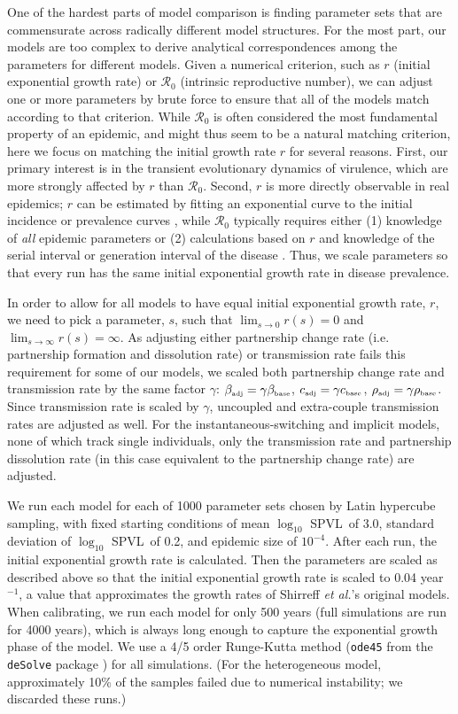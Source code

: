 \documentclass[10pt,letterpaper]{article}
\newcommand{\Lspvl}{$\log_{10}$ SPVL}
\newcommand{\rzero}{{\mathcal R}_0}
\newcommand{\etal}{\textit{et al.}}
\newcommand{\tsub}[2]{#1_{{\textrm{\tiny #2}}}}
\newcommand{\peryear}{year$^{-1}$}
\begin{document}
One of the hardest parts of model comparison is finding
parameter sets that are commensurate across radically different model
structures. For the most part, our models are too complex to
derive analytical correspondences among the parameters
for different models. Given a numerical
criterion, such as $r$ (initial exponential growth rate) or $\rzero$ 
(intrinsic reproductive number), we can adjust one or more
parameters by brute force to ensure that all of the models match
according to that criterion. While $\rzero$ is often considered
the most fundamental property of an epidemic, and might thus seem to
be a natural matching criterion, here we focus on matching the initial
growth rate $r$ for several reasons. First, our primary interest is in
the transient evolutionary dynamics of virulence, which are more
strongly affected by $r$ than $\rzero$. Second, $r$ is 
more directly observable in real epidemics; $r$ can be estimated by
fitting an exponential curve to the initial incidence or
prevalence curves \cite{ma_estimating_2014}, while $\rzero$
typically requires either (1) knowledge of \emph{all} epidemic
parameters or (2) calculations based on
$r$ and knowledge of the serial interval or generation interval of the
disease \cite{wallinga_how_2007}. Thus, we scale parameters so that
every run has the same initial exponential growth rate in 
disease prevalence.

In order to allow for all models to have equal initial exponential
growth rate, $r$, we need to pick a parameter, $s$, such that
$\lim_{s\to 0} r(s) = 0$ and $\lim_{s\to\infty} r(s) = \infty$. As
adjusting either partnership change rate (i.e. partnership formation
and dissolution rate) or transmission rate fails this requirement for
some of our models, we scaled both partnership change rate and
transmission rate by the same factor $\gamma$: $\tsub{\beta}{adj} =
\gamma \tsub{\beta}{base}$, $\tsub{c}{adj} = \gamma \tsub{c}{base}$,
$\tsub{\rho}{adj} = \gamma \tsub{\rho}{base}$. Since transmission rate
is scaled by $\gamma$, uncoupled and extra-couple
transmission rates are adjusted as well. For the instantaneous-switching
and implicit models, none of which track single individuals, 
only the transmission rate and partnership
dissolution rate (in this case equivalent to the partnership change
rate) are adjusted.

We run each model for each of 1000 parameter sets chosen by Latin hypercube sampling, with fixed starting conditions
of mean \Lspvl\ of 3.0, standard deviation of \Lspvl\ of 0.2, and epidemic size of $10^{-4}$. After each run, the initial exponential growth rate is calculated. Then the parameters are scaled as described above so that the initial exponential growth rate is scaled to 0.04 \peryear, a value that approximates the growth rates of Shirreff \etal's original models.
When calibrating, we run each model for only 500 years
(full simulations are run for 4000 years), which is always long
enough to capture the exponential growth phase of the model. 
We use a 4/5 order 
Runge-Kutta method (\texttt{ode45} from the \texttt{deSolve} package
\cite{soetaert_solving_2010}) for all simulations. 
(For the heterogeneous model, approximately
10\% of the samples failed due to numerical instability;
we discarded these runs.)
\end{document}

